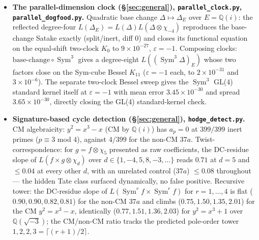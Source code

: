 \documentclass[11pt]{article}
\theoremstyle{definition}
\newcommand{\Sym}{\operatorname{Sym}}
\begin{document}
\begin{itemize}
\item \textbf{The parallel-dimension clock (\S\ref{sec:general}), \texttt{parallel\_clock.py},
\texttt{parallel\_dogfood.py}.} Quadratic base change $\Delta\mapsto\Delta_E$ over $E=\mathbb Q(i)$: the
reflected degree-four $L(\Delta_E)=L(\Delta)L(\Delta\otimes\chi_{-4})$ reproduces the base-change Satake
exactly (split/inert, diff $0$) and closes its functional equation on the equal-shift two-clock $K_0$ to
$9\times10^{-27}$, $\varepsilon=-1$. Composing clocks: $\mathrm{base\text{-}change}\circ\Sym^3$ gives a
degree-eight $L((\Sym^3\Delta)_E)$ whose two factors close on the Sym-cube Bessel $K_{11}$ ($\varepsilon=-1$
each, to $2\times10^{-31}$ and $3\times10^{-6}$). The separate two-clock Bessel sweep gives the
$\Sym^3$ GL(4) standard kernel itself at $\varepsilon=-1$ with mean error $3.45\times10^{-30}$ and spread
$3.65\times10^{-30}$, directly closing the GL(4) standard-kernel check.

\item \textbf{Signature-based cycle detection (\S\ref{sec:general}), \texttt{hodge\_detect.py}.} CM
algebraicity: $y^2=x^3-x$ (CM by $\mathbb Q(i)$) has $a_p=0$ at $399/399$ inert primes ($p\equiv3$ mod $4$),
against $4/399$ for the non-CM $37a$. Twist-correspondence: for $g=f\otimes\chi_5$ presented as raw
coefficients, the DC-residue slope of $L(f\times g\otimes\chi_d)$ over $d\in\{1,-4,5,8,-3,\dots\}$ reads
$0.71$ at $d=5$ and $\le0.04$ at every other $d$, with an unrelated control ($37a$) $\le0.08$ throughout ---
the hidden Tate class surfaced dynamically, no false positive. Recursive tower: the DC-residue slope of
$L(\Sym^r f\times\Sym^r f)$ for $r=1,\dots,4$ is flat ($0.90,0.90,0.82,0.81$) for the non-CM $37a$ and
climbs ($0.75,1.50,1.35,2.01$) for the CM $y^2=x^3-x$, identically ($0.77,1.51,1.36,2.03$) for
$y^2=x^3+1$ over $\mathbb Q(\sqrt{-3})$; the CM/non-CM ratio tracks the predicted pole-order tower
$1,2,2,3=\lceil(r{+}1)/2\rceil$.


\end{itemize}
\end{document}
